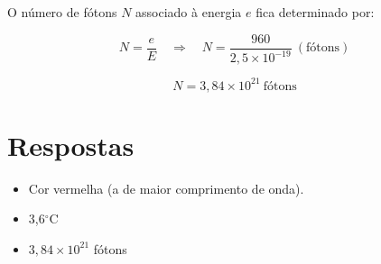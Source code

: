 \documentclass[a4paper,12pt]{article}
\newcommand{\printingbibliography}{%

    \pagestyle{myheadings}
    \markright{}
    \sloppy
    \printbibliography[heading=bibintoc, %
                   title=Refer\^encias %
                  ]
    \fussy%
}
\begin{document}
O número de fótons $N$ associado à energia $e$ fica determinado por:

\[
N = \frac{e}{E}
\quad \Rightarrow \quad
N = \frac{960}{2{,}5 \times 10^{-19}} \ (\text{fótons})
\]

\[
N = 3{,}84 \times 10^{21} \ \text{fótons}
\]

\vspace{0.5cm}

\section*{Respostas}

\begin{itemize}
\item[a)] Cor vermelha (a de maior comprimento de onda).
\item[b)] 3{,}6$^\circ$C
\item[c)] $3{,}84 \times 10^{21}$ fótons
\end{itemize}

\end{document}
